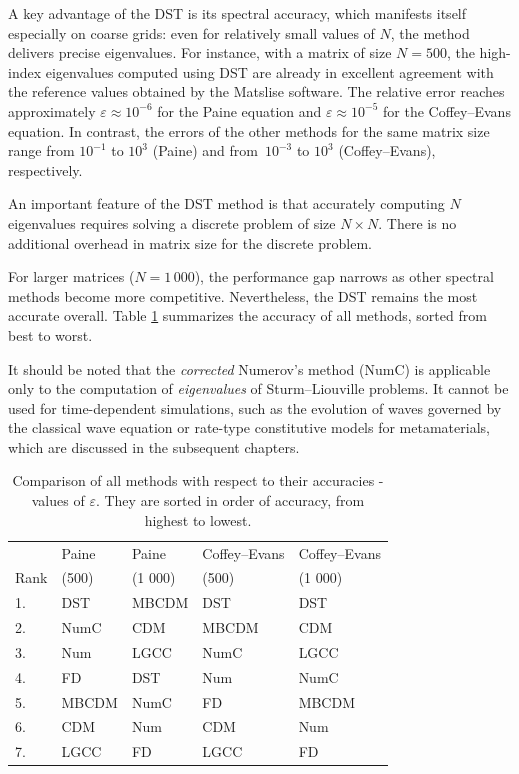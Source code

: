 \documentclass[11pt,a4paper,oneside,openright]{report} %
\begin{document}
A key advantage of the DST is its spectral accuracy, which manifests itself especially on coarse grids: even for relatively small values of $N$, the method delivers precise eigenvalues. For instance, with a matrix of size $N=500$, the high-index eigenvalues computed using DST are already in excellent agreement with the reference values obtained by the Matslise software. The relative error reaches approximately $\varepsilon \approx 10^{-6}$ for the Paine equation and $\varepsilon \approx 10^{-5}$ for the Coffey--Evans equation. In contrast, the errors of the other methods for the same matrix size range from $10^{-1}$ to $10^{3}$ (Paine) and from~$10^{-3}$ to $10^{3}$ (Coffey--Evans), respectively. 

An important feature of the DST method is that accurately computing $N$ eigenvalues requires solving a discrete problem of size $N \times N$. There is no additional overhead in matrix size for the discrete problem.

For larger matrices ($N=1 \,  000$), the performance gap narrows as other spectral methods become more competitive. Nevertheless, the DST remains the most accurate overall. Table \ref{table_comparison} summarizes the accuracy of all methods, sorted from best to worst.

It should be noted that the \textit{corrected} Numerov's method (NumC) is applicable only to the computation of \textit{eigenvalues} of Sturm--Liouville problems. It cannot be used for time-dependent simulations, such as the evolution of waves governed by the classical wave equation or rate-type constitutive models for metamaterials, which are discussed in the subsequent chapters.


\begin{table}[H]
\centering
\caption{Comparison of all methods with respect to their accuracies - values of $\varepsilon$. They are sorted in order of accuracy, from highest to lowest.}
\label{table_comparison}
{\small
\begin{tabularx}{\textwidth}{l *{4}{X}}
\toprule
 & Paine & Paine  & Coffey--Evans & Coffey--Evans \\
Rank & (500) & (1 000)  & (500) &  (1 000) \\
\midrule
1. & DST & MBCDM & DST & DST  \\
2. & NumC & CDM & MBCDM & CDM \\
3. & Num & LGCC &  NumC & LGCC \\
4. & FD & DST & Num & NumC  \\
5. & MBCDM & NumC & FD & MBCDM  \\
6. & CDM & Num & CDM & Num  \\
7. & LGCC & FD & LGCC & FD \\
\bottomrule
\end{tabularx}
}
\end{table}
\end{document}
